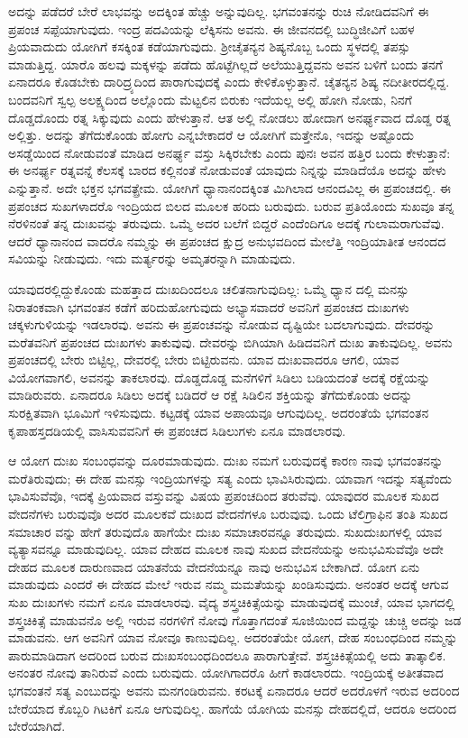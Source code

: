 ಅದನ್ನು ಪಡೆದರೆ ಬೇರೆ ಲಾಭವನ್ನು ಅದಕ್ಕಿಂತ ಹೆಚ್ಚು ಅನ್ನುವುದಿಲ್ಲ. ಭಗವಂತನನ್ನು ರುಚಿ ನೋಡಿದವನಿಗೆ ಈ ಪ್ರಪಂಚ ಸಪ್ಪೆಯಾಗುವುದು. ಇಂದ್ರ ಪದವಿಯನ್ನು ಲೆಕ್ಕಿಸನು ಅವನು. ಈ ಜೀವನದಲ್ಲಿ ಬುದ್ಧಿಜೀವಿಗೆ ಬಹಳ ಪ್ರಿಯವಾದುದು ಯೋಗಿಗೆ ಕಸಕ್ಕಿಂತ ಕಡೆಯಾಗುವುದು. ಶ್ರೀಚೈತನ್ಯನ ಶಿಷ್ಯನೊಬ್ಬ ಒಂದು ಸ್ಥಳದಲ್ಲಿ ತಪಸ್ಸು ಮಾಡುತ್ತಿದ್ದ. ಯಾರೊ ಹಲವು ಮಕ್ಕಳನ್ನು ಪಡೆದು ಹೊಟ್ಟೆಗಿಲ್ಲದೆ ಅಲೆಯುತ್ತಿದ್ದವನು ಅವನ ಬಳಿಗೆ ಬಂದು ತನಗೆ ಏನಾದರೂ ಕೊಡಬೇಕು ದಾರಿದ್ರ್ಯದಿಂದ ಪಾರಾಗುವುದಕ್ಕೆ ಎಂದು ಕೇಳಿಕೊಳ್ಳುತ್ತಾನೆ. ಚೈತನ್ಯನ ಶಿಷ್ಯ ನದೀತೀರದಲ್ಲಿದ್ದ. ಬಂದವನಿಗೆ ಸ್ವಲ್ಪ ಅಲಕ್ಷ್ಯದಿಂದ ಅಲ್ಲೊಂದು ಮೆಟ್ಟಲಿನ ಬಿರುಕು ಇದೆಯಲ್ಲ ಅಲ್ಲಿ ಹೋಗಿ ನೋಡು, ನಿನಗೆ ದೊಡ್ಡದೊಂದು ರತ್ನ ಸಿಕ್ಕುವುದು ಎಂದು ಹೇಳುತ್ತಾನೆ. ಆತ ಅಲ್ಲಿ ನೋಡಲು ಹೋದಾಗ ಅನರ್ಘ್ಯವಾದ ದೊಡ್ಡ ರತ್ನ ಅಲ್ಲಿತ್ತು. ಅದನ್ನು ತೆಗೆದುಕೊಂಡು ಹೋಗು ಎನ್ನಬೇಕಾದರೆ ಆ ಯೋಗಿಗೆ ಮತ್ತೇನೊ, ಇದನ್ನು ಅಷ್ಟೊಂದು ಅಸಡ್ಡೆಯಿಂದ ನೋಡುವಂತೆ ಮಾಡಿದ ಅನರ್ಘ್ಯ ವಸ್ತು ಸಿಕ್ಕಿರಬೇಕು ಎಂದು ಪುನಃ ಅವನ ಹತ್ತಿರ ಬಂದು ಕೇಳುತ್ತಾನೆ: ಈ ಅನರ್ಘ್ಯ ರತ್ನವನ್ನೆ ಕೆಲಸಕ್ಕೆ ಬಾರದ ಕಲ್ಲಿನಂತೆ ನೋಡುವಂತೆ ಯಾವುದು ನಿನ್ನನ್ನು ಮಾಡಿದೆಯೊ ಅದನ್ನು ಹೇಳು ಎನ್ನುತ್ತಾನೆ. ಅದೇ ಭಕ್ತನ ಭಗವತ್ಪ್ರೇಮ. ಯೋಗಿಗೆ ಧ್ಯಾನಾನಂದಕ್ಕಿಂತ ಮಿಗಿಲಾದ ಆನಂದವಿಲ್ಲ ಈ ಪ್ರಪಂಚದಲ್ಲಿ. ಈ ಪ್ರಪಂಚದ ಸುಖಗಳಾದರೊ ಇಂದ್ರಿಯದ ಬಿಲದ ಮೂಲಕ ಹರಿದು ಬರುವುದು. ಬರುವ ಪ್ರತಿಯೊಂದು ಸುಖವೂ ತನ್ನ ನೆರಳಿನಂತೆ ತನ್ನ ದುಃಖವನ್ನು ತರುವುದು. ಒಮ್ಮೆ ಅದರ ಬಲೆಗೆ ಬಿದ್ದರೆ ಎಂದೆಂದಿಗೂ ಅದಕ್ಕೆ ಗುಲಾಮರಾಗುವೆವು. ಆದರೆ ಧ್ಯಾನಾನಂದ ವಾದರೊ ನಮ್ಮನ್ನು ಈ ಪ್ರಪಂಚದ ಕ್ಷುದ್ರ ಅನುಭವದಿಂದ ಮೇಲೆತ್ತಿ ಇಂದ್ರಿಯಾತೀತ ಆನಂದದ ಸವಿಯನ್ನು ನೀಡುವುದು. ಇದು ಮರ್ತ್ಯರನ್ನು ಅಮೃತರನ್ನಾಗಿ ಮಾಡುವುದು.

ಯಾವುದರಲ್ಲಿದ್ದುಕೊಂಡು ಮಹತ್ತಾದ ದುಃಖದಿಂದಲೂ ಚಲಿತನಾಗುವುದಿಲ್ಲ: ಒಮ್ಮೆ ಧ್ಯಾನ ದಲ್ಲಿ ಮನಸ್ಸು ನಿರಾತಂಕವಾಗಿ ಭಗವಂತನ ಕಡೆಗೆ ಹರಿದುಹೋಗುವುದು ಅಭ್ಯಾಸವಾದರೆ ಅವನಿಗೆ ಪ್ರಪಂಚದ ದುಃಖಗಳು ಚಕ್ಕಳುಗುಳಿಯನ್ನು ಇಡಲಾರವು. ಅವನು ಈ ಪ್ರಪಂಚವನ್ನು ನೋಡುವ ದೃಷ್ಟಿಯೇ ಬದಲಾಗುವುದು. ದೇವರನ್ನು ಮರೆತವನಿಗೆ ಪ್ರಪಂಚದ ದುಃಖಗಳು ತಾಕುವುವು. ದೇವರನ್ನು ಬಿಗಿಯಾಗಿ ಹಿಡಿದವನಿಗೆ ದುಃಖ ತಾಕುವುದಿಲ್ಲ. ಅವನು ಪ್ರಪಂಚದಲ್ಲಿ ಬೇರು ಬಿಟ್ಟಿಲ್ಲ, ದೇವರಲ್ಲಿ ಬೇರು ಬಿಟ್ಟಿರುವನು. ಯಾವ ದುಃಖವಾದರೂ ಆಗಲಿ, ಯಾವ ವಿಯೋಗವಾಗಲಿ, ಅವನನ್ನು ತಾಕಲಾರವು. ದೊಡ್ಡದೊಡ್ಡ ಮನೆಗಳಿಗೆ ಸಿಡಿಲು ಬಡಿಯದಂತೆ ಅದಕ್ಕೆ ರಕ್ಷೆಯನ್ನು ಮಾಡಿರುವರು. ಏನಾದರೂ ಸಿಡಿಲು ಅದಕ್ಕೆ ಬಡಿದರೆ ಆ ರಕ್ಷೆ ಸಿಡಿಲಿನ ಶಕ್ತಿಯನ್ನು ತೆಗೆದುಕೊಂಡು ಅದನ್ನು ಸುರಕ್ಷಿತವಾಗಿ ಭೂಮಿಗೆ ಇಳಿಸುವುದು. ಕಟ್ಟಡಕ್ಕೆ ಯಾವ ಅಪಾಯವೂ ಆಗುವುದಿಲ್ಲ. ಅದರಂತೆಯೆ ಭಗವಂತನ ಕೃಪಾಹಸ್ತದಡಿಯಲ್ಲಿ ವಾಸಿಸುವವನಿಗೆ ಈ ಪ್ರಪಂಚದ ಸಿಡಿಲುಗಳು ಏನೂ ಮಾಡಲಾರವು.

ಆ ಯೋಗ ದುಃಖ ಸಂಬಂಧವನ್ನು ದೂರಮಾಡುವುದು. ದುಃಖ ನಮಗೆ ಬರುವುದಕ್ಕೆ ಕಾರಣ ನಾವು ಭಗವಂತನನ್ನು ಮರೆತಿರುವುದು; ಈ ದೇಹ ಮನಸ್ಸು ಇಂದ್ರಿಯಗಳನ್ನು ಸತ್ಯ ಎಂದು ಭಾವಿಸಿರುವುದು. ಯಾವಾಗ ಇದನ್ನು ಸತ್ಯವೆಂದು ಭಾವಿಸುವೆವೊ, ಇದಕ್ಕೆ ಪ್ರಿಯವಾದ ವಸ್ತುವನ್ನು ವಿಷಯ ಪ್ರಪಂಚದಿಂದ ತರುವೆವು. ಯಾವುದರ ಮೂಲಕ ಸುಖದ ವೇದನೆಗಳು ಬರುವುವೊ ಅದರ ಮೂಲಕವೆ ದುಃಖದ ವೇದನೆಗಳೂ ಬರುವುವು. ಒಂದು ಟೆಲಿಗ್ರಾಫಿನ ತಂತಿ ಸುಖದ ಸಮಾಚಾರ ವನ್ನು ಹೇಗೆ ತರುವುದೊ ಹಾಗೆಯೇ ದುಃಖ ಸಮಾಚಾರವನ್ನೂ ತರುವುದು. ಸುಖದುಃಖಗಳಲ್ಲಿ ಯಾವ ವ್ಯತ್ಯಾಸವನ್ನೂ ಮಾಡುವುದಿಲ್ಲ. ಯಾವ ದೇಹದ ಮೂಲಕ ನಾವು ಸುಖದ ವೇದನೆಯನ್ನು ಅನುಭವಿಸುವೆವೊ ಅದೇ ದೇಹದ ಮೂಲಕ ದಾರುಣವಾದ ಯಾತನೆಯ ವೇದನೆಯನ್ನೂ ನಾವು ಅನುಭವಿಸ ಬೇಕಾಗಿದೆ. ಯೋಗ ಏನು ಮಾಡುವುದು ಎಂದರೆ ಈ ದೇಹದ ಮೇಲೆ ಇರುವ ನಮ್ಮ ಮಮತೆಯನ್ನು ಖಂಡಿಸುವುದು. ಅನಂತರ ಅದಕ್ಕೆ ಆಗುವ ಸುಖ ದುಃಖಗಳು ನಮಗೆ ಏನೂ ಮಾಡಲಾರವು. ವೈದ್ಯ ಶಸ್ತ್ರಚಿಕಿತ್ಸೆಯನ್ನು ಮಾಡುವುದಕ್ಕೆ ಮುಂಚೆ, ಯಾವ ಭಾಗದಲ್ಲಿ ಶಸ್ತ್ರಚಿಕಿತ್ಸೆ ಮಾಡುವನೊ ಅಲ್ಲಿ ಇರುವ ನರಗಳಿಗೆ ನೋವು ಗೊತ್ತಾಗದಂತೆ ಸೂಜಿಯಿಂದ ಮದ್ದನ್ನು ಚುಚ್ಚಿ ಅದನ್ನು ಜಡ ಮಾಡುವನು. ಆಗ ಅವನಿಗೆ ಯಾವ ನೋವೂ ಕಾಣುವುದಿಲ್ಲ. ಅದರಂತೆಯೇ ಯೋಗ, ದೇಹ ಸಂಬಂಧದಿಂದ ನಮ್ಮನ್ನು ಪಾರುಮಾಡಿದಾಗ ಅದರಿಂದ ಬರುವ ದುಃಖಸಂಬಂಧದಿಂದಲೂ ಪಾರಾಗುತ್ತೇವೆ. ಶಸ್ತ್ರಚಿಕಿತ್ಸೆಯಲ್ಲಿ ಅದು ತಾತ್ಕಾಲಿಕ. ಅನಂತರ ನೋವು ತಾನಿರುವೆ ಎಂದು ಬರುವುದು. ಯೋಗಿಗಾದರೊ ಹೀಗೆ ಕಾಡಲಾರದು. ಇಂದ್ರಿಯಕ್ಕೆ ಅತೀತವಾದ ಭಗವಂತನೆ ಸತ್ಯ ಎಂಬುದನ್ನು ಅವನು ಮನಗಂಡಿರುವನು. ಕರಟಕ್ಕೆ ಏನಾದರೂ ಆದರೆ ಅದರೊಳಗೆ ಇರುವ ಅದರಿಂದ ಬೇರೆಯಾದ ಕೊಬ್ಬರಿ ಗಿಟಕಿಗೆ ಏನೂ ಆಗುವುದಿಲ್ಲ. ಹಾಗೆಯೆ ಯೋಗಿಯ ಮನಸ್ಸು ದೇಹದಲ್ಲಿದೆ, ಆದರೂ ಅದರಿಂದ ಬೇರೆಯಾಗಿದೆ.

